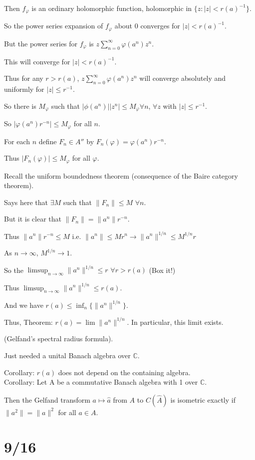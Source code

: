 \documentclass[12pt]{article}
\newcommand{\inv}{^{-1}}
\begin{document}
Then $f_\varphi$ is an ordinary holomorphic function, holomorphic in $\{z: |z| < r(a)\inv\}$.

So the power series expansion of $f_\varphi$ about 0 converges for $|z| < r(a)\inv$.

But the power series for $f_\varphi$ is $z\sum_{n = 0}^\infty \varphi(a^n)z^n$.

This will converge for $|z| < r(a)\inv$.

Thus for any $r > r(a)$, $z\sum_{n = 0}^\infty \varphi(a^n)z^n$ will converge absolutely and uniformly for $|z| \leq r\inv$.

So there is $M_\varphi$ such that $|\phi(a^n)||z^n| \leq M_\varphi \forall n$, $\forall z$ with $|z| \leq r\inv$.

So $|\varphi(a^n)r^{-n}| \leq M_\varphi$ for all $n$.

For each $n$ define $F_n \in A''$ by $F_n(\varphi) = \varphi(a^n)r^{-n}$.

Thus $|F_n(\varphi)| \leq M_\varphi$ for all $\varphi$.

Recall the uniform boundedness theorem (consequence of the Baire category theorem).

Says here that $\exists M$ such that $\|F_n\| \leq M$ $\forall n$.

But it is clear that $\|F_n\| = \|a^n\|r^{-n}$.

Thus $\|a^n\|r^{-n} \leq M$ i.e. $\|a^n\| \leq Mr^n \to \|a^n\|^{1/n} \leq M^{1/n}r$

As $n \to \infty$, $M^{1/n} \to 1$.

So the $\limsup_{n \to \infty} \|a^n\|^{1/n} \leq r$ $\forall r > r(a)$ (Box it!)

Thus $\limsup_{n \to \infty}\|a^n\|^{1/n} \leq r(a)$.

And we have $r(a) \leq \inf_n\{\|a^n\|^{1/n}\}$.

\noindent
Thus, Theorem: $r(a) = \lim\|a^n\|^{1/n}$.  In particular, this limit exists.

(Gelfand's spectral radius formula).

Just needed a unital Banach algebra over $\mathds{C}$.

\noindent
Corollary: $r(a)$ does not depend on the containing algebra.\\

\noindent
Corollary: Let A be a commutative Banach algebra with 1 over $\mathds{C}$.

Then the Gelfand transform $a \mapsto \hat{a}$ from $A$ to $C(\hat{A})$ is isometric exactly if $\|a^2\| = \|a\|^2$ for all $a \in A$.

\section{9/16}
\end{document}
